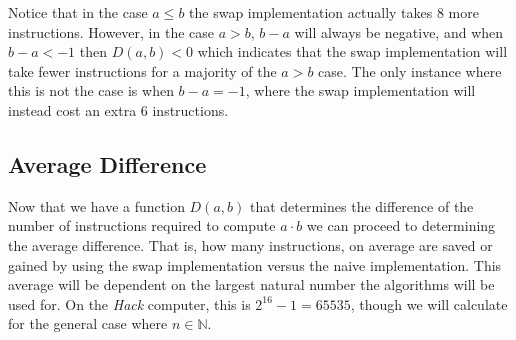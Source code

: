 \documentclass[a4paper,10pt,fleqn]{article}
\begin{document}
Notice that in the case $a \leq b$ the swap implementation actually takes 8 more instructions.
However, in the case $a > b$, $b - a$ will always be negative, and when $b - a < -1$ then
$D(a,b) < 0$ which indicates that the swap implementation will take fewer instructions for a
majority of the $a > b$ case. The only instance where this is not the case is when
$b - a = -1$, where the swap implementation will instead cost an extra 6 instructions.

\subsection{Average Difference}

Now that we have a function $D(a,b)$ that determines the difference of the number of
instructions required to compute $a \cdot b$ we can proceed to determining the average
difference. That is, how many instructions, on average are saved or gained by using the swap
implementation versus the naive implementation. This average will be dependent on the largest
natural number the algorithms will be used for. On the \emph{Hack} computer, this is
$2^{16} - 1 = 65535$, though we will calculate for the general case where $n \in \mathbb{N}$.
\end{document}
